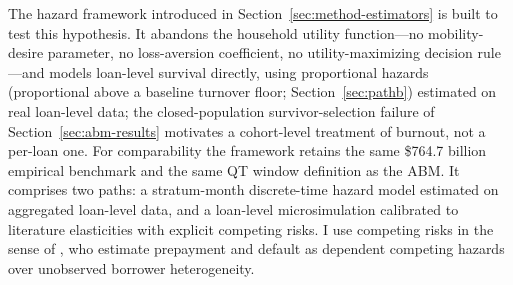 \documentclass[12pt]{article}
\begin{document}
The hazard framework introduced in Section~\ref{sec:method-estimators} is built to test this hypothesis. It abandons the household utility function---no mobility-desire parameter, no loss-aversion coefficient, no utility-maximizing decision rule---and models loan-level survival directly, using proportional hazards (proportional above a baseline turnover floor; Section~\ref{sec:pathb}) estimated on real loan-level data; the closed-population survivor-selection failure of Section~\ref{sec:abm-results} motivates a cohort-level treatment of burnout, not a per-loan one. For comparability the framework retains the same \$764.7 billion empirical benchmark and the same QT window definition as the ABM. It comprises two paths: a stratum-month discrete-time hazard model estimated on aggregated loan-level data, and a loan-level microsimulation calibrated to literature elasticities with explicit competing risks. I use competing risks in the sense of \citet{deng2000}, who estimate prepayment and default as dependent competing hazards over unobserved borrower heterogeneity.
\end{document}
